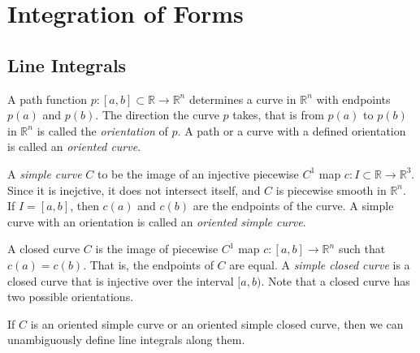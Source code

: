\section{Integration of Forms}

\subsection{Line Integrals}

  \begin{definition}
		A path function $p: [a,b]\subset \mathbb{R} \longrightarrow \mathbb{R}^n$ determines a curve in $\mathbb{R}^n$ with endpoints $p(a)$ and $p(b)$. The direction the curve $p$ takes, that is from $p(a)$ to $p(b)$ in $\mathbb{R}^n$ is called the \textit{orientation} of $p$. A path or a curve with a defined orientation is called an \textit{oriented curve}. 

		A \textit{simple curve} $C$ to be the image of an injective piecewise $C^1$ map $c: I \subset \mathbb{R} \longrightarrow \mathbb{R}^3$. Since it is inejctive, it does not intersect itself, and $C$ is piecewise smooth in $\mathbb{R}^n$. If $I = [a,b]$, then $c(a)$ and $c(b)$ are the endpoints of the curve. A simple curve with an orientation is called an \textit{oriented simple curve}. 

		A closed curve $C$ is the image of piecewise $C^1$ map $c: [a,b] \longrightarrow \mathbb{R}^n$ such that $c(a) = c(b)$. That is, the endpoints of $C$ are equal. A \textit{simple closed curve} is a closed curve that is injective over the interval $[a,b)$. Note that a closed curve has two possible orientations. 
  \end{definition}

  If $C$ is an oriented simple curve or an oriented simple closed curve, then we can unambiguously define line integrals along them. 

